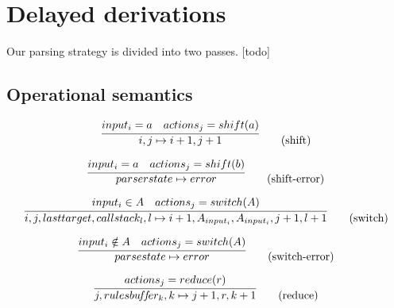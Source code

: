 \documentclass[envcountsame,runningheads]{llncs}
\begin{document}



\section{Delayed derivations}

Our parsing strategy is divided into two passes.
[todo]

\subsection{Operational semantics}

\begin{equation}
\infer{i, j \mapsto i+1, j+1}{input_i = a & actions_j = shift(a)} \tag{shift}
\end{equation}

\begin{equation}
\infer{parserstate \mapsto error}{input_i = a & actions_j = shift(b)} \tag{shift-error}
\end{equation}

\begin{equation}
\infer{i, j, lasttarget, callstack_l, l \mapsto i+1, A_{input_i}, A_{input_i}, j+1, l+1}{input_i \in A & actions_j = switch(A)} \tag{switch}
\end{equation}

\begin{equation}
\infer{parsestate \mapsto error}{input_i \notin A & actions_j = switch(A)} \tag{switch-error}
\end{equation}

\begin{equation}
\infer{j, rulesbu\!f\!f\!er_k, k \mapsto j+1, r, k+1}{actions_j = reduce(r)} \tag{reduce}
\end{equation}
\end{document}
